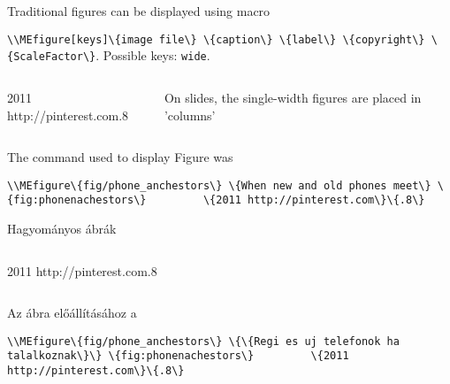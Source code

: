 



{
Traditional figures can be displayed using macro
\par\noindent\lstinline|\\MEfigure[keys]\{image file\} \{caption\} \{label\} \{copyright\} \{ScaleFactor\}|.
Possible keys: \lstinline|wide|.


\begin{columns}
		{2011 http://pinterest.com}{.8}

On slides, the single-width figures are placed in 'columns'
\end{columns}

\par\noindent The command used to display Figure\ao{~\ref{fig:phonenanchestors}} was
\par\noindent\lstinline|\\MEfigure\{fig/phone_anchestors\} \{When new and old phones meet\} \{fig:phonenachestors\}
		\{2011 http://pinterest.com\}\{.8\}|

}
{Hagyományos ábrák}
{
\begin{columns}
		{2011 http://pinterest.com}{.8}
\end{columns}
\par\noindent Az \ao{~\ref{fig:phonenachestors}} ábra előállításához a
\par\noindent\lstinline|\\MEfigure\{fig/phone_anchestors\} \{\{Regi es uj telefonok ha talalkoznak\}\} \{fig:phonenachestors\}
		\{2011 http://pinterest.com\}\{.8\}|
}


